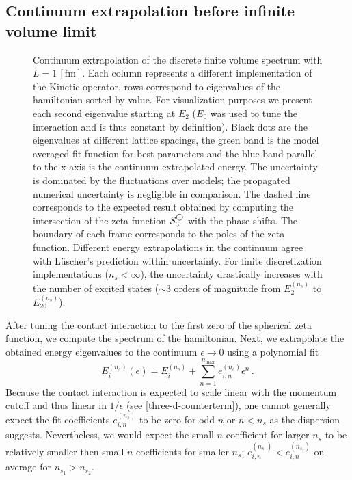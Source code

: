 \subsection{Continuum extrapolation before infinite volume limit}

\begin{figure}[!htb]
\scalebox{1.0}{}
\caption{
    \label{fig:continuum-extrapolation-spectrum}
    Continuum extrapolation of the discrete finite volume spectrum with $L=1\,[\mathrm{fm}]$.
    Each column represents a different implementation of the Kinetic operator, rows correspond to eigenvalues of the hamiltonian sorted by value.
    For visualization purposes we present each second eigenvalue starting at $E_2$ ($E_0$ was used to tune the interaction and is thus constant by definition).
    Black dots are the eigenvalues at different lattice spacings, the green band is the model averaged fit function for best parameters and the blue band parallel to the x-axis is the continuum extrapolated energy.
    The uncertainty is dominated by the fluctuations over models; the propagated numerical uncertainty is negligible in comparison.
    The dashed line corresponds to the expected result obtained by computing the intersection of the zeta function $S^{\bigcirc}_3$ with the phase shifts.
    The boundary of each frame corresponds to the poles of the zeta function.
    Different energy extrapolations in the continuum agree with Lüscher's prediction within uncertainty.
    For finite discretization implementations ($n_s < \infty$), the uncertainty drastically increases with the number of excited states ($\sim 3$ orders of magnitude from $E_2^{(n_s)}$ to $E_{20}^{(n_s)}$).
}
\end{figure}

After tuning the contact interaction to the first zero of the spherical zeta function, we compute the spectrum of the hamiltonian.
Next, we extrapolate the obtained energy eigenvalues to the continuum $\epsilon \to 0$ using a polynomial fit
\begin{equation}
    E^{(n_s)}_i(\epsilon) = E_i^{(n_s)} + \sum\limits_{n=1}^{n_\mathrm{max}} e_{i,n}^{(n_s)} \epsilon^n \, .
\end{equation}
Because the contact interaction is expected to scale linear with the momentum cutoff and thus linear in $1/\epsilon$ (see \eqref{three-d-counterterm}), one cannot generally expect the fit coefficients $e_{i,n}^{(n_s)}$ to be zero for odd $n$ or $n < n_s$ as the dispersion suggests.
Nevertheless, we would expect the small $n$ coefficient for larger $n_s$ to be relatively smaller then small $n$ coefficients for smaller $n_s$: $e_{i,n}^{(n_{s_1})} < e_{i,n}^{(n_{s_2})}$ on average for $n_{s_1} > n_{s_2}$.

